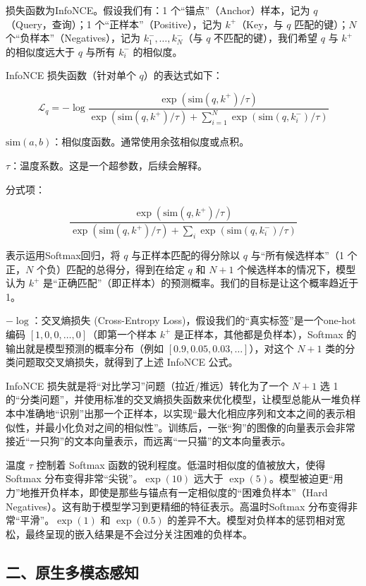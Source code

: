 损失函数为InfoNCE。假设我们有：1 个``锚点''（Anchor）样本，记为 \(q\)（Query，查询）；1 个``正样本''（Positive），记为 \(k^+\)（Key，与 \(q\) 匹配的键）；\(N\) 个``负样本''（Negatives），记为 \(k_1^-,\ldots,k_N^-\)（与 \(q\) 不匹配的键），我们希望 \(q\) 与 \(k^+\) 的相似度远大于 \(q\) 与所有 \(k_i^-\) 的相似度。

InfoNCE 损失函数（针对单个 \(q\)）的表达式如下：

\[
\mathcal{L}_q=-\log \frac{\exp(\mathrm{sim}(q,k^+)/\tau)}
{\exp(\mathrm{sim}(q,k^+)/\tau)+\sum_{i=1}^{N}\exp(\mathrm{sim}(q,k_i^-)/\tau)}
\]

\(\mathrm{sim}(a,b)\)：相似度函数。通常使用余弦相似度或点积。

\(\tau\)：温度系数。这是一个超参数，后续会解释。

分式项：

\[
\frac{\exp(\mathrm{sim}(q,k^+)/\tau)}
{\exp(\mathrm{sim}(q,k^+)/\tau)+\sum_i\exp(\mathrm{sim}(q,k_i^-)/\tau)}
\]

表示运用Softmax回归，将 \(q\) 与正样本匹配的得分除以 \(q\) 与``所有候选样本''（1 个正，\(N\) 个负）匹配的总得分，得到在给定 \(q\) 和 \(N+1\) 个候选样本的情况下，模型认为 \(k^+\) 是``正确匹配''（即正样本）的预测概率。我们的目标是让这个概率趋近于 1。

\(-\log\)：交叉熵损失 (Cross-Entropy Loss)，假设我们的``真实标签''是一个one-hot编码 \([1,0,0,\ldots,0]\)（即第一个样本 \(k^+\) 是正样本，其他都是负样本），Softmax 的输出就是模型预测的概率分布（例如 \([0.9,0.05,0.03,\ldots]\)），对这个 \(N+1\) 类的分类问题取交叉熵损失，就得到了上述 InfoNCE 公式。

InfoNCE 损失就是将``对比学习''问题（拉近/推远）转化为了一个 \(N+1\) 选 1 的``分类问题''，并使用标准的交叉熵损失函数来优化模型，让模型总能从一堆负样本中准确地``识别''出那一个正样本，以实现``最大化相应序列和文本之间的表示相似性，并最小化负对之间的相似性''。训练后，一张``狗''的图像的向量表示会非常接近``一只狗''的文本向量表示，而远离``一只猫''的文本向量表示。

温度 \(\tau\) 控制着 Softmax 函数的锐利程度。低温时相似度的值被放大，使得 Softmax 分布变得非常``尖锐''。\(\exp(10)\) 远大于 \(\exp(5)\)。模型被迫更``用力''地推开负样本，即使是那些与锚点有一定相似度的``困难负样本''（Hard Negatives）。这有助于模型学习到更精细的特征表示。高温时Softmax 分布变得非常``平滑''。\(\exp(1)\) 和 \(\exp(0.5)\) 的差异不大。模型对负样本的惩罚相对宽松，最终呈现的嵌入结果是不会过分关注困难的负样本。

\hypertarget{ux4e8cux539fux751fux591aux6a21ux6001ux611fux77e5}{%
\subsection{二、原生多模态感知}\label{ux4e8cux539fux751fux591aux6a21ux6001ux611fux77e5}}

